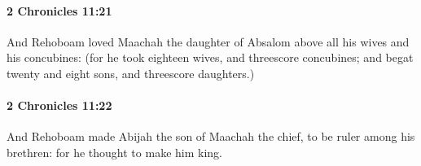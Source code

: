 		\paragraph{2 Chronicles 11:21} %
			\label{2CHRONICLES-11-21}

			And Rehoboam loved Maachah the daughter of Absalom above all his wives and his concubines: (for he took eighteen wives, and threescore concubines; and begat twenty and eight sons, and threescore daughters.)


		\paragraph{2 Chronicles 11:22} %
			\label{2CHRONICLES-11-22}

			And Rehoboam made Abijah the son of Maachah the chief, to be ruler among his brethren: for he thought to make him king.


